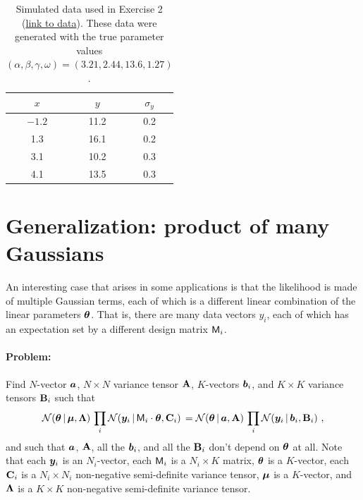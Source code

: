 \begin{table}[t!]
  \footnotesize
  \begin{center}
    \begin{tabular}{c|c|c}
      $x$ & $y$ & $\sigma_y$ \\
      \hline
      $-1.2$ & 11.2 & 0.2 \\
      1.3 & 16.1 & 0.2 \\
      3.1 & 10.2 & 0.3 \\
      4.1 & 13.5 & 0.3
    \end{tabular}
    \caption{Simulated data used in Exercise 2
    (\href{https://raw.githubusercontent.com/davidwhogg/GaussianProductRefactor/master/notebooks/data2.csv}{link to data}). These data were generated with the true parameter values $(\alpha, \beta, \gamma, \omega) = (3.21, 2.44, 13.6, 1.27)$.
    \label{tbl:data2}}
  \end{center}
\end{table}


\section{Generalization: product of many Gaussians}

An interesting case that arises in some applications is that the
likelihood is made of multiple Gaussian terms, each of which is a
different linear combination of the linear parameters $\boldsymbol{\theta}$.
That is, there are many data vectors $y_i$, each of which has an expectation
set by a different design matrix $\mathsf{M}_i$.

\paragraph{Problem:}
Find $N$-vector $\boldsymbol{a}$, $N\times N$ variance tensor $\mathbf{A}$, $K$-vectors $\boldsymbol{b}_i$,
and $K\times K$ variance tensors $\mathbf{B}_i$ such that
\begin{equation}\label{eq:genproblem}
\mathcal{N}\!\,(\boldsymbol{\theta}\,|\,\boldsymbol{\mu},\mathbf{\Lambda})\,\prod_i\mathcal{N}\!\,(\boldsymbol{y}_i\,|\,\mathsf{M}_i\cdot\boldsymbol{\theta},\mathbf{C}_i)\,
 = \mathcal{N}\!\,(\boldsymbol{\theta}\,|\,\boldsymbol{a},\mathbf{A})\,\prod_i\mathcal{N}\!\,(\boldsymbol{y}_i\,|\,\boldsymbol{b}_i,\mathbf{B}_i) ~ ,
\end{equation}
and such that $\boldsymbol{a}$, $\mathbf{A}$, all the $\boldsymbol{b}_i$, and all the $\mathbf{B}_i$
don't depend on $\boldsymbol{\theta}$ at all.
Note that
each $\boldsymbol{y}_i$ is an $N_i$-vector,
each $\mathsf{M}_i$ is a $N_i\times K$ matrix,
$\boldsymbol{\theta}$ is a $K$-vector,
each $\mathbf{C}_i$ is a $N_i\times N_i$ non-negative semi-definite variance tensor,
$\boldsymbol{\mu}$ is a $K$-vector,
and
$\mathbf{\Lambda}$ is a $K\times K$ non-negative semi-definite variance tensor.

